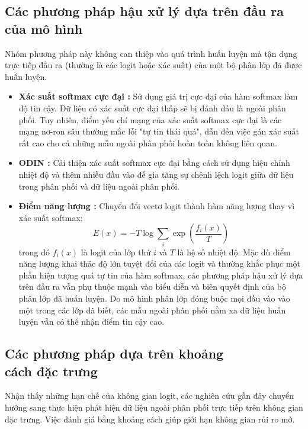 \subsection{Các phương pháp hậu xử lý dựa trên đầu ra của mô hình}
Nhóm phương pháp này không can thiệp vào quá trình huấn luyện mà tận dụng trực tiếp đầu ra (thường là các logit hoặc xác suất) của một bộ phân lớp đã được huấn luyện.

\begin{itemize}
    \item \textbf{Xác suất softmax cực đại \cite{Hendrycks2017MSP}:} Sử dụng giá trị cực đại của hàm softmax làm độ tin cậy. Dữ liệu có xác suất cực đại thấp sẽ bị đánh dấu là ngoài phân phối. Tuy nhiên, điểm yếu chí mạng của xác suất softmax cực đại là các mạng nơ-ron sâu thường mắc lỗi "tự tin thái quá", dẫn đến việc gán xác suất rất cao cho cả những mẫu ngoài phân phối hoàn toàn không liên quan.
    \item \textbf{ODIN \cite{Liang2018ODIN}:} Cải thiện xác suất softmax cực đại bằng cách sử dụng hiệu chỉnh nhiệt độ và thêm nhiễu đầu vào để gia tăng sự chênh lệch logit giữa dữ liệu trong phân phối và dữ liệu ngoài phân phối.
    \pagebreak
    \item \textbf{Điểm năng lượng \cite{Liu2020EnergyOOD}:} Chuyển đổi vectơ logit thành hàm năng lượng thay vì xác suất softmax:
    \begin{equation}
    E(x) = -T \log \sum_i \exp\left(\frac{f_i(x)}{T}\right)
    \label{eq:energy_score}
    \end{equation}
    trong đó $f_i(x)$ là logit của lớp thứ $i$ và $T$ là hệ số nhiệt độ.
    Mặc dù điểm năng lượng khai thác độ lớn tuyệt đối của các logit và thường khắc phục một phần hiện tượng quá tự tin của hàm softmax, các phương pháp hậu xử lý dựa trên đầu ra vẫn phụ thuộc mạnh vào biểu diễn và biên quyết định của bộ phân lớp đã huấn luyện. Do mô hình phân lớp đóng buộc mọi đầu vào vào một trong các lớp đã biết, các mẫu ngoài phân phối nằm xa dữ liệu huấn luyện vẫn có thể nhận điểm tin cậy cao.
\end{itemize}

\subsection[Các phương pháp dựa trên khoảng cách]{Các phương pháp dựa trên khoảng\\cách đặc trưng}
Nhận thấy những hạn chế của không gian logit, các nghiên cứu gần đây chuyển hướng sang thực hiện phát hiện dữ liệu ngoài phân phối trực tiếp trên không gian đặc trưng. Việc đánh giá bằng khoảng cách giúp giới hạn không gian rủi ro mở.

